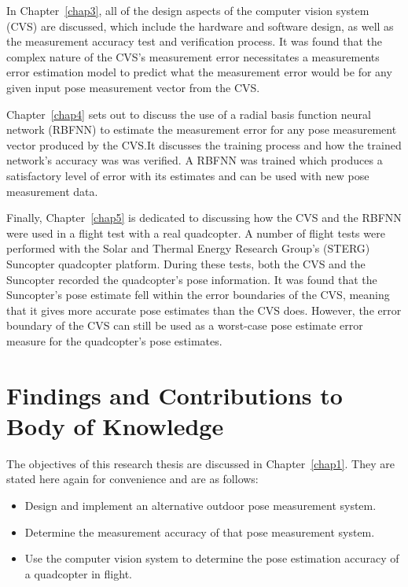 In Chapter~\ref{chap3}, all of the design aspects of the computer vision system (CVS) are discussed, which include the hardware and software design, as well as the measurement accuracy test and verification process. It was found that the complex nature of the CVS's measurement error necessitates a measurements error estimation model to predict what the measurement error would be for any given input pose measurement vector from the CVS.\@ 

Chapter~\ref{chap4} sets out to discuss the use of a radial basis function neural network (RBFNN) to estimate the measurement error for any pose measurement vector produced by the CVS.\@ It discusses the training process and how the trained network's accuracy was was verified. A RBFNN was trained which produces a satisfactory level of error with its estimates and can be used with new pose measurement data.

Finally, Chapter~\ref{chap5} is dedicated to discussing how the CVS and the RBFNN were used in a flight test with a real quadcopter. A number of flight tests were performed with the Solar and Thermal Energy Research Group's (STERG) Suncopter quadcopter platform. During these tests, both the CVS and the Suncopter recorded the quadcopter's pose information. It was found that the Suncopter's pose estimate fell within the error boundaries of the CVS, meaning that it gives more accurate pose estimates than the CVS does. However, the error boundary of the CVS can still be used as a worst-case pose estimate error measure for the quadcopter's pose estimates. 

\section{Findings and Contributions to Body of Knowledge}

The objectives of this research thesis are discussed in Chapter~\ref{chap1}. They are stated here again for convenience and are as follows:

\begin{itemize}
  \item Design and implement an alternative outdoor pose measurement system.
  \item Determine the measurement accuracy of that pose measurement system.
  \item Use the computer vision system to determine the pose estimation accuracy of a quadcopter in flight. 
\end{itemize}

